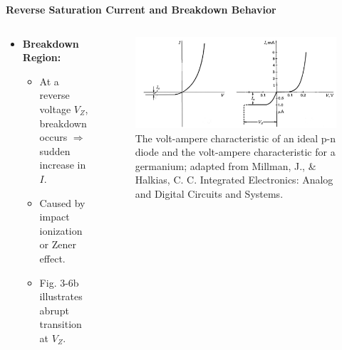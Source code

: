 \begin{frame}{\textbf{Reverse Saturation Current and Breakdown Behavior}}
	\begin{columns}
		\begin{column}{0.225\textwidth}
\begin{itemize}
	\item \textbf{Breakdown Region:}
	\begin{itemize}
		\item At a reverse voltage $V_Z$, breakdown occurs $\Rightarrow$ sudden increase in $I$.
		\item Caused by impact ionization or Zener effect.
		\item Fig. 3-6b illustrates abrupt transition at $V_Z$.
	\end{itemize}
\end{itemize}
\end{column}
\begin{column}{0.775\textwidth}
	\begin{figure}
		\centering
		\includegraphics[scale=0.25]{fig/lec03/VI_characteristics.png}
		\caption{The volt-ampere characteristic of an ideal p-n diode and the volt-ampere characteristic for a germanium; adapted from Millman, J., \& Halkias, C. C. Integrated Electronics: Analog and Digital Circuits and Systems.}
		\label{fig:diode_characteristics}
	\end{figure}
	\end{column}
	\end{columns}
\end{frame}



